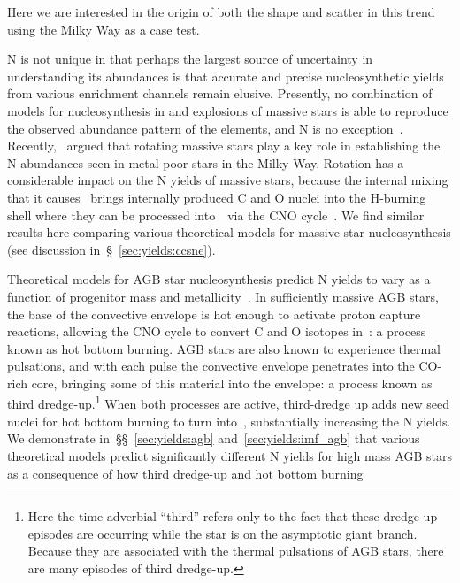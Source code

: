 \documentclass[ms.tex]{subfiles}
\begin{document}
Here we are interested in the origin of both the shape and scatter in this
trend using the Milky Way as a case test.
\par
N is not unique in that perhaps the largest source of uncertainty in
understanding its abundances is that accurate and precise nucleosynthetic yields
from various enrichment channels remain elusive.
Presently, no combination of models for nucleosynthesis in and explosions of
massive stars is able to reproduce the observed abundance pattern of the
elements, and N is no exception~\citep{Griffith2021a}.
Recently,~\citet*{Grisoni2021} argued that rotating massive stars play a key
role in establishing the N abundances seen in metal-poor stars in the Milky Way.
Rotation has a considerable impact on the N yields of massive stars, because the
internal mixing that it causes~\citep{Zahn1992, Maeder1998, Lagarde2012} brings
internally produced C and O nuclei into the H-burning shell where they can be
processed into~\Nfourteen~via the CNO cycle~\citep{Heger2010, Frischknecht2016,
Andrews2017}.
We find similar results here comparing various theoretical models for
massive star nucleosynthesis (see discussion in~\S~\ref{sec:yields:ccsne}).
\par
Theoretical models for AGB star nucleosynthesis predict N yields to vary as a
function of progenitor mass and metallicity~\citep{Cristallo2011, Cristallo2015,
Karakas2010, Karakas2016, Karakas2018, Ventura2013, Ventura2014, Ventura2018,
Ventura2020}.
In sufficiently massive AGB stars, the base of the convective envelope is hot
enough to activate proton capture reactions, allowing the CNO cycle to convert
C and O isotopes in~\Nfourteen: a process known as hot bottom burning.
AGB stars are also known to experience thermal pulsations, and with each pulse
the convective envelope penetrates into the CO-rich core, bringing some of this
material into the envelope: a process known as third dredge-up.\footnote{
	Here the time adverbial ``third'' refers only to the fact that these
	dredge-up episodes are occurring while the star is on the asymptotic giant
	branch. Because they are associated with the thermal pulsations of AGB
	stars, there are many episodes of third dredge-up.
}
When both processes are active, third-dredge up adds new seed nuclei for hot
bottom burning to turn into~\Nfourteen, substantially increasing the N yields.
We demonstrate in~\S\S~\ref{sec:yields:agb} and~\ref{sec:yields:imf_agb} that
various theoretical models predict significantly different N yields for high
mass AGB stars as a consequence of how third dredge-up and hot bottom burning
\end{document}
